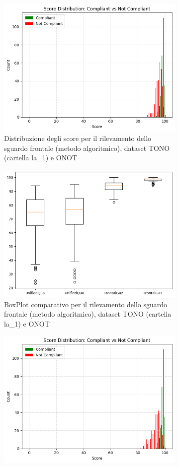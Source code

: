 \documentclass[12pt,a4paper,openright,twoside]{book}
\begin{document}
\begin{figure}[htbp]
    \centering
    \begin{subfigure}{0.49\textwidth}
        \centering
    \includegraphics[width=.7\linewidth]{figures/score-distribution-tono-onot-l1-frontal-gaze-algo.png}
    \caption{Distribuzione degli score per il rilevamento dello sguardo frontale (metodo algoritmico), dataset TONO (cartella la\_1) e ONOT}
    \label{fig:score_distribution_tono_onot_l1_frontal_gaze_algo}
    \end{subfigure}
    \hfill
    \begin{subfigure}{0.49\textwidth}
        \centering
        \includegraphics[width=.7\linewidth]{figures/box-plot-tono-onot-l1-frontal-gaze-algo.png}
        \caption{BoxPlot comparativo per il rilevamento dello sguardo frontale (metodo algoritmico), dataset TONO (cartella la\_1) e ONOT}
        \label{fig:box_plot_tono_onot_l1_frontal_gaze_algo}
    \end{subfigure}
    \begin{subfigure}{0.49\textwidth}
        \centering
        \includegraphics[width=.7\linewidth]{figures/score-distribution-tono-onot-l2-frontal-gaze-algo.png}

\end{subfigure}
\end{figure}
\end{document}
